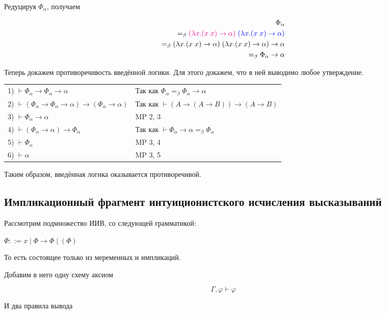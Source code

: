 Редуцируя $\Phi_{\alpha}$, получаем 

\begin{align*}
\Phi_{\alpha} \\ =_{\beta} \textcolor{magenta}{(\lambda x. (x \; x) \rightarrow \alpha)} \; \textcolor{blue}{(\lambda x. (x \; x) \rightarrow \alpha)} \\=_{\beta} (\lambda x. (x \; x) \rightarrow \alpha) \; (\lambda x. (x \; x) \rightarrow \alpha) \rightarrow \alpha \\=_{\beta} \Phi_{\alpha} \rightarrow \alpha
\end{align*}

Теперь докажем противоречивость введённой логики. Для этого докажем, что в ней выводимо любое утверждение.

\begin{tabular}{ll}
	1) $\vdash\Phi_\alpha\rightarrow\Phi_\alpha\rightarrow\alpha$ & Так как $\Phi_{\alpha} =_{\beta} \Phi_{\alpha} \rightarrow \alpha$\\
	2) $\vdash(\Phi_\alpha\rightarrow\Phi_\alpha\rightarrow\alpha)\rightarrow(\Phi_\alpha\rightarrow\alpha)$ & Так как $\vdash (A \rightarrow (A \rightarrow B)) \rightarrow (A \rightarrow B)$\\
	3) $\vdash\Phi_\alpha\rightarrow\alpha$ & MP 2, 3\\
	4) $\vdash (\Phi_\alpha \rightarrow \alpha) \rightarrow \Phi_\alpha$ & Так как $\vdash \Phi_\alpha \rightarrow \alpha =_{\beta} \Phi_\alpha$\\
	5) $\vdash\Phi_\alpha$ & MP 3, 4\\
	6) $\vdash\alpha$ & MP 3, 5
\end{tabular}

Таким образом, введённая логика оказывается противоречивой.

\subsection{Импликационный фрагмент интуиционистского исчисления высказываний}

Рассмотрим подмножество ИИВ, со следующей грамматикой:

$\Phi ::= x \; | \; \Phi \rightarrow \Phi \; | \; (\Phi)$

То есть состоящее только из меременных и импликаций. 

Добавим в него одну схему аксиом

$$\Gamma, \varphi \vdash \varphi$$

И два правила вывода

